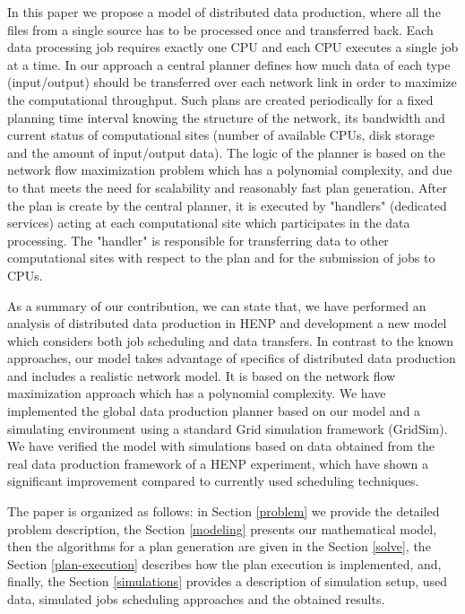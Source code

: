 \documentclass{svjour3}                     %
\begin{document}
In this paper we propose a model of distributed data production, where all the files from a single source has to be processed once and transferred back. Each data processing job requires exactly one CPU and each CPU executes a single job at a time. In our approach a central planner defines how much data of each type (input/output) should be transferred over each network link in order to maximize the computational throughput. Such plans are created periodically for a fixed planning time interval knowing the structure of the network, its bandwidth and current status of computational sites (number of available CPUs, disk storage and the amount of input/output data). The logic of the planner is based on the network flow maximization problem which has a polynomial complexity, and due to that meets the need for scalability and reasonably fast plan generation. After the plan is create by the central planner, it is executed by "handlers" (dedicated services) acting at each computational site which participates in the data processing. The "handler" is responsible for transferring data to other computational sites with respect to the plan and for the submission of jobs to CPUs. 
 
As a summary of our contribution, we can state that, we have performed an analysis of distributed data production in HENP and development a new model which considers both job scheduling and data transfers. In contrast to the known approaches, our model takes advantage of specifics of distributed data production and includes a realistic network model. It is based on the network flow maximization approach which has a polynomial complexity. We have implemented the global data production planner based on our model and a simulating environment using a standard Grid simulation framework (GridSim). We have verified the model with simulations based on data obtained from the real data production framework of a HENP experiment, which have shown a significant improvement compared to currently used scheduling techniques. 

The paper is organized as follows: in Section \ref{problem} we provide the detailed problem description, the Section \ref{modeling} presents our mathematical model, then the algorithms for a plan generation are given in the Section \ref{solve}, the Section \ref{plan-execution} describes how the plan execution is implemented, and, finally, the Section \ref{simulations} provides a description of simulation setup, used data, simulated jobs scheduling approaches and the obtained results. 
\end{document}
